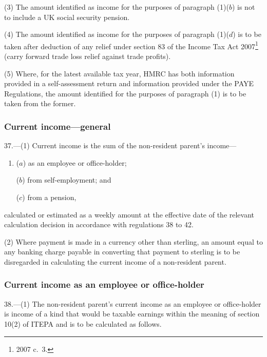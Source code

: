 \documentclass[12pt,a4paper]{article}
\begin{document}
(3) The amount identified as income for the purposes of paragraph (1)($b$)  is not to include a UK social security pension.

(4) The amount identified as income for the purposes of paragraph (1)($d$)  is to be taken after deduction of any relief under section 83 of the Income Tax Act 2007\footnote{2007 c.~3.} (carry forward trade loss relief against trade profits).

(5) Where, for the latest available tax year, HMRC has both information provided in a self-assessment return and information provided under the PAYE Regulations, the amount identified for the purposes of paragraph (1) is to be taken from the former.

\subsubsection[37. Current income---general]{Current income---general}

37.---(1)  Current income is the sum of the non-resident parent’s income—
\begin{enumerate}\item[]
($a$) as an employee or office-holder;

($b$) from self-employment; and

($c$) from a pension,
\end{enumerate}
calculated or estimated as a weekly amount at the effective date of the relevant calculation decision in accordance with regulations 38 to 42.

(2) Where payment is made in a currency other than sterling, an amount equal to any banking charge payable in converting that payment to sterling is to be disregarded in calculating the current income of a non-resident parent.

\subsubsection[38. Current income as an employee or office-holder]{Current income as an employee or office-holder}

38.---(1)  The non-resident parent’s current income as an employee or office-holder is income of a kind that would be taxable earnings within the meaning of section 10(2) of ITEPA and is to be calculated as follows.
\end{document}
